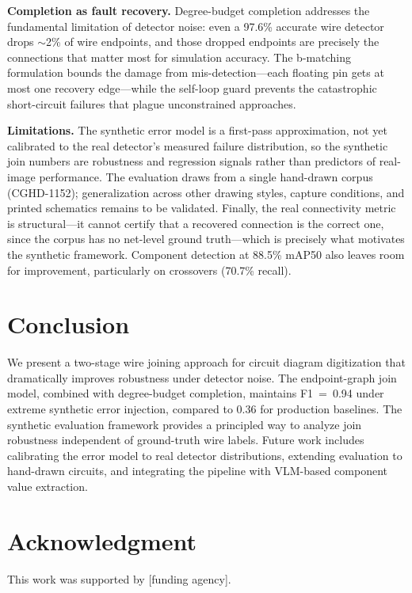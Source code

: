 \documentclass[conference]{IEEEtran}
\begin{document}
\textbf{Completion as fault recovery.} Degree-budget completion addresses the fundamental limitation of detector noise: even a 97.6\% accurate wire detector drops $\sim$2\% of wire endpoints, and those dropped endpoints are precisely the connections that matter most for simulation accuracy. The b-matching formulation bounds the damage from mis-detection---each floating pin gets at most one recovery edge---while the self-loop guard prevents the catastrophic short-circuit failures that plague unconstrained approaches.

\textbf{Limitations.} The synthetic error model is a first-pass approximation, not yet calibrated to the real detector's measured failure distribution, so the synthetic join numbers are robustness and regression signals rather than predictors of real-image performance. The evaluation draws from a single hand-drawn corpus (CGHD-1152); generalization across other drawing styles, capture conditions, and printed schematics remains to be validated. Finally, the real connectivity metric is structural---it cannot certify that a recovered connection is the correct one, since the corpus has no net-level ground truth---which is precisely what motivates the synthetic framework. Component detection at 88.5\% mAP50 also leaves room for improvement, particularly on crossovers (70.7\% recall).

\section{Conclusion}

We present a two-stage wire joining approach for circuit diagram digitization that dramatically improves robustness under detector noise. The endpoint-graph join model, combined with degree-budget completion, maintains F1~=~0.94 under extreme synthetic error injection, compared to 0.36 for production baselines. The synthetic evaluation framework provides a principled way to analyze join robustness independent of ground-truth wire labels. Future work includes calibrating the error model to real detector distributions, extending evaluation to hand-drawn circuits, and integrating the pipeline with VLM-based component value extraction.

\section*{Acknowledgment}

This work was supported by [funding agency].
\end{document}
